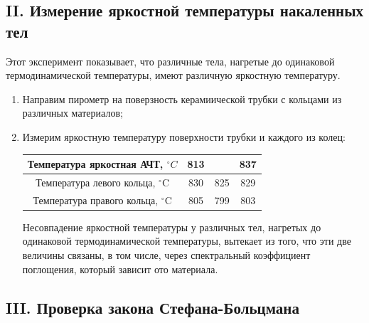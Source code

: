 \documentclass[a4paper,12pt]{article}
\begin{document}
\subsection{II. Измерение яркостной температуры накаленных тел}

Этот эксперимент показывает, что различные тела, нагретые до одинаковой термодинамической температуры, имеют различную яркостную температуру.

\begin{enumerate}

    \item Направим пирометр на поверзность керамиической трубки с кольцами из различных материалов;
    \item Измерим яркостную температуру поверхности трубки и каждого из колец:

    \begin{table}[h!]
    \centering
    \begin{tabular}{||c||c|c|c||}
    \hline
    Температура яркостная АЧТ, $^\circ C$ & 813 &  & 837 \\
    \hline
    Температура левого кольца, $^\circ$C & 830 & 825 & 829 \\
    \hline 
    Температура правого кольца, $^\circ$C & 805 & 799 & 803 \\
    \hline
    \end{tabular}
    \end{table}

Несовпадение яркостной температуры у различных тел, нагретых до одинаковой термодинамической температуры, вытекает из того, что эти две величины связаны, в том числе, через спектральный коэффициент поглощения, который зависит ото материала. 
    
\end{enumerate}


\subsection{III. Проверка закона Стефана-Больцмана}
\end{document}
